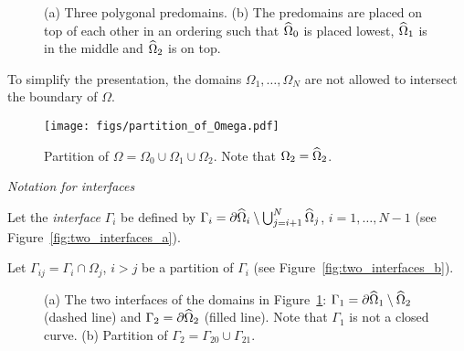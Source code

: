 \documentclass[graybox]{svmult}
\begin{document}
\begin{figure}
  \centering
  \qquad\qquad\qquad
  \caption{(a) Three polygonal predomains. (b) The predomains are placed on top of each other in an ordering such that
    $\widehat{\Omega}_0$ is placed lowest, $\widehat{\Omega}_1$ is in the middle and $\widehat{\Omega}_2$ is on top.}
  \label{fig:three_domains}
\end{figure}

\begin{remark}
  \label{rem:boundary-overlap}
To simplify the presentation, the domains $\Omega_1, \ldots, \Omega_N$ are not allowed to intersect the boundary of $\Omega$.
\end{remark}

\begin{figure}
  \begin{center}
    \texttt{[image: figs/partition\_of\_Omega.pdf]}
    \caption{Partition of $\Omega = \Omega_0 \cup \Omega_1 \cup \Omega_2$. Note that $\Omega_2 = \widehat{\Omega}_2$.}
    \label{fig:three_domains_partition}
  \end{center}
\end{figure}

\begin{mytcolorbox}
\emph{Notation for interfaces}
\tcblower

Let the \emph{interface} $\Gamma_i$ be defined by $\Gamma_i = \partial \widehat{\Omega}_i \setminus \bigcup_{j=i+1}^N \widehat{\Omega}_j$, $i=1, \ldots, N-1$ (see Figure~\ref{fig:two_interfaces_a}).

Let $\Gamma_{ij} = \Gamma_i \cap \Omega_j$, $i > j$ be a partition of $\Gamma_i$ (see Figure~\ref{fig:two_interfaces_b}).
\end{mytcolorbox}

\begin{figure}
  \centering
  \qquad\qquad\qquad
  \caption{(a) The two interfaces of the domains in Figure~\ref{fig:three_domains}: $\Gamma_1 = \partial \widehat{\Omega}_1 \setminus \widehat{\Omega}_2$ (dashed line) and  $\Gamma_2 = \partial \widehat{\Omega}_2$ (filled line). Note that $\Gamma_1$ is not a closed curve. (b) Partition of $\Gamma_2 = \Gamma_{20} \cup \Gamma_{21}$.}
\end{figure}
\end{document}
